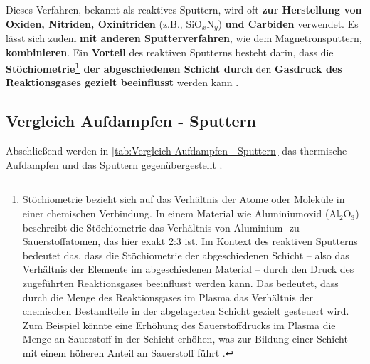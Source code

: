 \documentclass{article} %
\begin{document}
Dieses Verfahren, bekannt als reaktives Sputtern, wird oft \textbf{zur Herstellung von Oxiden, Nitriden, Oxinitriden} (z.B., \(\mathrm{SiO}_x\mathrm{N}_y\)) 
\textbf{und Carbiden} verwendet. Es lässt sich zudem \textbf{mit anderen Sputterverfahren}, wie dem Magnetronsputtern, \textbf{kombinieren}. Ein \textbf{Vorteil} 
des reaktiven Sputterns besteht darin, dass die \textbf{Stöchiometrie\footnote{Stöchiometrie bezieht sich auf das Verhältnis der Atome oder Moleküle in einer 
chemischen Verbindung. In einem Material wie Aluminiumoxid (\(\mathrm{Al}_2\mathrm{O}_3\)) beschreibt die Stöchiometrie das Verhältnis von Aluminium- zu 
Sauerstoffatomen, das hier exakt 2:3 ist. Im Kontext des reaktiven Sputterns bedeutet das, dass die Stöchiometrie der abgeschiedenen Schicht -- also das 
Verhältnis der Elemente im abgeschiedenen Material -- durch den Druck des zugeführten Reaktionsgases beeinflusst werden kann. Das bedeutet, dass durch die Menge 
des Reaktionsgases im Plasma das Verhältnis der chemischen Bestandteile in der abgelagerten Schicht gezielt gesteuert wird. Zum Beispiel könnte eine Erhöhung des 
Sauerstoffdrucks im Plasma die Menge an Sauerstoff in der Schicht erhöhen, was zur Bildung einer Schicht mit einem höheren Anteil an Sauerstoff führt 
\cite{anders2010reactive, ohring2002, mattox2010handbook, rossnagel2003magnetron}.} der abgeschiedenen Schicht durch} den \textbf{Gasdruck des Reaktionsgases 
gezielt beeinflusst} werden kann \cite{keplinger2024}.

\vspace{1em}
\subsection{Vergleich Aufdampfen - Sputtern}
Abschließend werden in \autoref{tab:Vergleich Aufdampfen - Sputtern} das thermische Aufdampfen und das Sputtern gegenübergestellt \cite{keplinger2024}.
\end{document}
